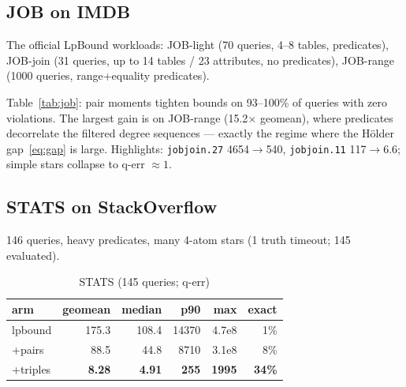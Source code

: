 \subsection{JOB on IMDB}
\label{sec:exp:job}

The official LpBound workloads: JOB-light (70 queries, 4--8 tables,
predicates), JOB-join (31 queries, up to 14 tables / 23 attributes,
no predicates), JOB-range (1000 queries, range+equality predicates).

\begin{table}[t]
\centering\small
\caption{JOB workloads on IMDB (q-err; viol $=$ bound $<$ truth)}
\label{tab:job}
\end{table}

Table~\ref{tab:job}: pair moments tighten bounds on 93--100\% of
queries with zero violations.  The largest gain is on JOB-range
(15.2$\times$ geomean), where predicates decorrelate the filtered
degree sequences --- exactly the regime where the H\"older
gap~\eqref{eq:gap} is large.  Highlights: \texttt{jobjoin.27}
4654$\to$540, \texttt{jobjoin.11} 117$\to$6.6; simple stars collapse
to q-err $\approx 1$.

\subsection{STATS on StackOverflow}
\label{sec:exp:stats}

146 queries, heavy predicates, many 4-atom stars (1 truth timeout;
145 evaluated).

\begin{table}[t]
\centering\small
\caption{STATS (145 queries; q-err)}
\label{tab:stats}
\begin{tabular}{@{}lrrrrr@{}}
\toprule
arm & geomean & median & p90 & max & exact \\ \midrule
lpbound  & 175.3 & 108.4 & 14370 & 4.7e8  & 1\% \\
+pairs   & 88.5  & 44.8  & 8710  & 3.1e8  & 8\% \\
+triples & \textbf{8.28} & \textbf{4.91} & \textbf{255} & \textbf{1995} & \textbf{34\%} \\ \bottomrule
\end{tabular}
\end{table}


